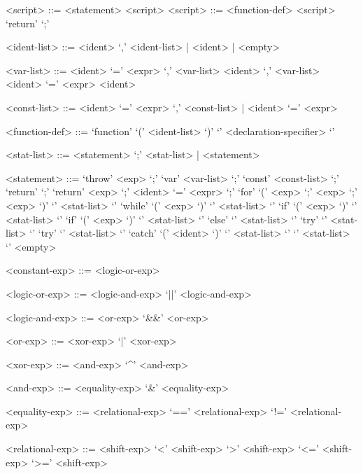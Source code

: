 
\setlength{\grammarparsep}{20pt plus 1pt minus 1pt} %
\setlength{\grammarindent}{8em} %

\begin{grammar}
	<script> ::= <statement> <script>
	<script> ::= <function-def> <script>
	\alt `return' `;'

	<ident-list> ::= <ident> `,' <ident-list> | <ident> | <empty>

	<var-list> ::= <ident> `=' <expr> `,' <var-list> 
	\alt <ident> `,' <var-list> 
	\alt <ident> `=' <expr>
	\alt <ident>

	<const-list> ::= <ident> `=' <expr> `,' <const-list> | <ident> `=' <expr>

	<function-def> ::= `function' `(' <ident-list> `)' `{' <declaration-specifier> `}'

	<stat-list> ::= <statement> `;' <stat-list> | <statement>

	<statement> ::= `throw' <exp> `;'
	\alt `var' <var-list> `;'
	\alt `const' <const-list> `;'
	\alt `return' `;'
	\alt `return' <exp> `;'
	\alt <ident> `=' <expr> `;'
	\alt `for' `(' <exp> `;' <exp> `;' <exp> `)' `{' <stat-list> `}'
	\alt `while' `(' <exp> `)' `{' <stat-list> `}'
	\alt `if' `(' <exp> `)' `{' <stat-list> `}' 
	\alt `if' `(' <exp> `)' `{' <stat-list> `}' `else' `{' <stat-list> `}'
	\alt `try' `{' <stat-list> `}' 
	\alt `try' `{' <stat-list> `}' `catch' `(' <ident> `)' `{' <stat-list> `}'
	\alt `{' <stat-list> `}'
	\alt <empty>

	<constant-exp> ::= <logic-or-exp> 

	<logic-or-exp> ::= <logic-and-exp> 
	\alt <logic-or-exp> `||' <logic-and-exp> 

	<logic-and-exp> ::= <or-exp> 
	\alt <logic-and-exp> `\&\&' <or-exp> 

	<or-exp> ::= <xor-exp> 
	\alt <or-exp> `|' <xor-exp> 

	<xor-exp> ::= <and-exp> 
	\alt <xor-exp> `^' <and-exp> 

	<and-exp> ::= <equality-exp> 
	\alt <and-exp> `\&' <equality-exp> 

	<equality-exp> ::= <relational-exp>
	\alt <equality-exp> `==' <relational-exp>
	\alt <equality-exp> `!=' <relational-exp>

	<relational-exp> ::= <shift-exp>
	\alt <relational-exp> `<' <shift-exp>
	\alt <relational-exp> `>' <shift-exp>
	\alt <relational-exp> `<=' <shift-exp>
	\alt <relational-exp> `>=' <shift-exp>


\end{grammar}
